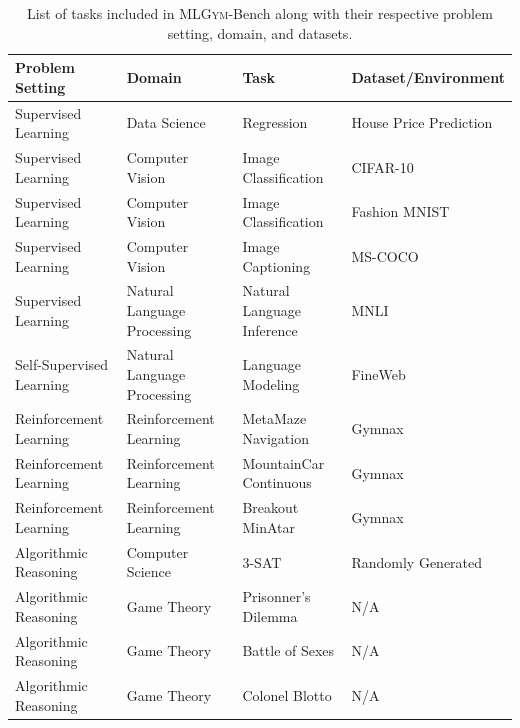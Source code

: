 \documentclass[]{fairmeta}
\newcommand{\rr}[1]{\colorbox{red}{\textcolor{white}{Roberta}}\textcolor{red}{\textbf{:#1}}}
\newcommand{\dm}[1]{\colorbox{Emerald}{\textcolor{white}{Despoina}}\textcolor{Emerald}{\textbf{:#1}}}
\newcommand{\mlgym}{\fontfamily{lmr}\selectfont\mdseries\textsc{MLGym}\xspace}
\begin{document}
\begin{table}[!h]
    \centering
    \begin{adjustbox}{width=\textwidth}
    \begin{NiceTabular}{llll}
        \toprule
        Problem Setting & Domain & Task & Dataset/Environment \\
        \midrule
        Supervised Learning & Data Science & Regression & House Price Prediction \\
        \midrule
        Supervised Learning & Computer Vision & Image Classification & CIFAR-10~\citep{krizhevsky2009learning} \\
        Supervised Learning & Computer Vision & Image Classification & Fashion MNIST~\citep{xiao2017/online} \\
        Supervised Learning & Computer Vision & Image Captioning & MS-COCO~\citep{lin2014microsoft}  \\
        \midrule
        Supervised Learning & Natural Language Processing & Natural Language Inference & MNLI~\citep{williams2018multi}  \\
        Self-Supervised Learning & Natural Language Processing & Language Modeling & FineWeb~\citep{penedo2024finewebdatasetsdecantingweb}  \\
        \midrule
        Reinforcement Learning & Reinforcement Learning & MetaMaze Navigation & Gymnax~\citep{gymnax2022github} \\
        Reinforcement Learning & Reinforcement Learning & MountainCar Continuous & Gymnax~\citep{gymnax2022github} \\
        Reinforcement Learning & Reinforcement Learning & Breakout MinAtar &  Gymnax~\citep{gymnax2022github}
        \\
        \midrule
        Algorithmic Reasoning  & Computer Science & 3-SAT & Randomly Generated~\citep{selsam2018satAlgorithm} \\ 
        \midrule
        Algorithmic Reasoning  & Game Theory & Prisonner's Dilemma & N/A\\
        Algorithmic Reasoning  & Game Theory & Battle of Sexes & N/A \\
        Algorithmic Reasoning  &  Game Theory & Colonel Blotto & N/A \\
        \bottomrule
    \end{NiceTabular}
    \end{adjustbox}
    \caption{List of tasks included in \mlgym-Bench along with their respective problem setting, domain, and datasets.}
    \label{tab:aup_scores}
\end{table}
\end{document}
